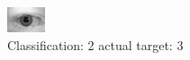 \begin{figure}[h!]
\begin{center}
\includegraphics[width=0.60\columnwidth]{figures/ID646_class_2_target_3.png}
\end{center}
\caption{ Classification: 2 actual target: 3}
\label{fig:ID646_class_2_target_3}
\end{figure}

